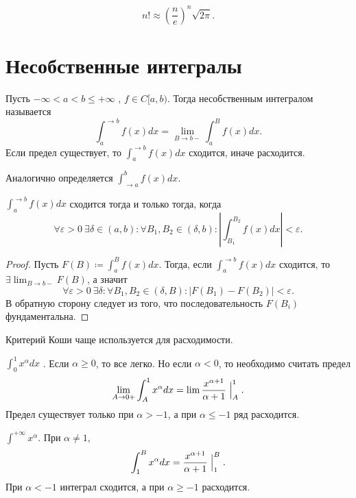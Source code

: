 \begin{thm}
     \[
	 n! \approx \left( \frac{n}{e} \right) ^{n} \sqrt{ 2\pi} 
    .\] 
\end{thm}

\section{Несобственные интегралы}
\begin{defn}
    Пусть $-\infty<a<b\le +\infty$ , $f\in C[a,b)$. Тогда {\sf несобственным интегралом} называется  
    \[
	\int_a^{\to b} f(x) dx=\lim_{B\to b-} \int_a^B f(x) dx
    .\]
    Если предел существует, то $\int_a^{\to b} f(x) dx$ {\sf сходится}, иначе {\sf расходится}.

    Аналогично определяется $\int_{\to a}^b f(x) dx$.
\end{defn}
\begin{thm}
    $ \int_{a}^{\to b} f(x) dx $ сходится тогда и только тогда, когда 
    \[
	\forall \varepsilon >0 ~ \exists \delta \in (a, b)\colon \forall B_1, B_2 \in (\delta , b)\colon \left| \int_{B_1}^{B_2}f(x)dx \right| < \varepsilon 
    .\] 
\end{thm}
\begin{proof}
    Пусть $F(B) \coloneqq \int_a^B f(x) dx$. 
    Тогда, если $\int_a^{\to b} f(x)dx$ сходится, то $\exists \lim_{B\to b-} F(B)$, а значит 
    \[
	\forall \varepsilon>0~ \exists  \delta\colon  \forall  B_1,B_2\in (\delta,B)\colon  |F(B_1)-F(B_2)|<\varepsilon
    .\]
    В обратную сторону следует из того, что последовательность $F(B_i)$ фундаментальна.
\end{proof}
\begin{note}
    Критерий Коши чаще используется для расходимости.
\end{note}
\begin{ex}
    $\int_0^1 x^\alpha dx$ . 
    Если $\alpha \ge 0$, то все легко. Но если $\alpha < 0$, то необходимо считать предел 
    \[
	\lim_{A\to 0+} \int_A^1 x^\alpha dx=\lim \frac{x^{\alpha+1}}{\alpha+1}\Bigm|_A^1
    .\]
Предел существует только при $\alpha>-1$, а при $\alpha\le -1$ ряд расходится.
\end{ex}
\begin{ex}
    $\int^{+\infty} x^\alpha$. 
    При $\alpha\neq 1$, 
    \[
	\int_1^B x^\alpha dx=\frac{x^{\alpha+1}}{\alpha+1}\Bigm|_1^B.
    \]
    При $\alpha<-1$ интеграл сходится, а при $\alpha\ge -1$ расходится.
\end{ex}
% 
